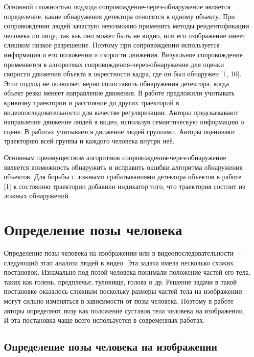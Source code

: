 Основной сложностью подхода сопровождение-через-обнаружение является определение, какие обнаружения детектора относятся к одному объекту. При сопровождении людей зачастую невозможно применить методы реидентификации человека по лицу, так как оно может быть не видно, или его изображение имеет слишком низкое разрешение. Поэтому при сопровождении используется информация о его положении и скорости движения. Визуальное сопровождение применяется в алгоритмах сопровождения-через-обнаружение для оценки скорости движения объекта в окрестности кадра, где он был обнаружен [1, 10]. Этот подход не позволяет верно сопоставить обнаружения детектора, когда объект резко меняет направление движения. В работе \cite{milan2013detection} предложили учитывать кривизну траектории и расстояние до других траекторий в видеопоследовательности для качестве регуляризации. Авторы \cite{gong2011multi} предсказывают направление движение людей в видео, используя семантическую информацию о сцене. В работах \cite{leal2011everybody,choi2012unified} учитывается движение людей группами. Авторы оценивают траекторию всей группы и каждого человека внутри неё.

Основным преимуществом алгоритмов сопровождения-через-обнаружение является возможность обнаружить и исправить ошибки алгоритма обнаружения объектов. Для борьбы с ложными срабатываниями детектора объектов в работе [1] к состоянию траектории добавили индикатор того, что траектория состоит из ложных обнаружений. 

\section{Определение позы человека} \label{chapt-related::human_pose_definithion}

Определение позы человека на изображении или в видеопоследовательности --- следующий этап анализа людей в видео. Эта задача имела несколько схожих постановок. Изначально под позой человека понимали положение частей его тела, таких как голень, предплечье, туловище, голова и др. Решение задачи в такой постановке оказалось сложным поскольку размеры частей тела на изображении могут сильно изменяться в зависимости от позы человека. Поэтому в работе \cite{yang2011articulated} авторы определяют позу как положение суставов тела человека на изображении. И эта постановка чаще всего используется в современных работах.

\subsection{Определение позы человека на изображении}

